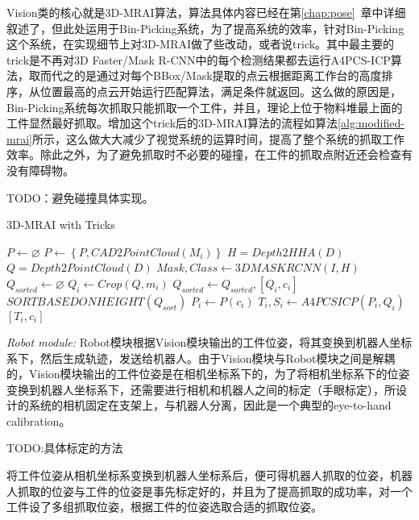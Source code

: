 Vision类的核心就是3D-MRAI算法，算法具体内容已经在第\ref{chap:pose}~章中详细叙述了，但此处运用于Bin-Picking系统，为了提高系统的效率，针对Bin-Picking这个系统，在实现细节上对3D-MRAI做了些改动，或者说trick。其中最主要的trick是不再对3D Faster/Mask R-CNN中的每个检测结果都去运行A4PCS-ICP算法，取而代之的是通过对每个BBox/Mask提取的点云根据距离工作台的高度排序，从位置最高的点云开始运行匹配算法，满足条件就返回。这么做的原因是，Bin-Picking系统每次抓取只能抓取一个工件，并且，理论上位于物料堆最上面的工件显然最好抓取。增加这个trick后的3D-MRAI算法的流程如算法\ref{alg:modified-mrai}所示，这么做大大减少了视觉系统的运算时间，提高了整个系统的抓取工作效率。除此之外，为了避免抓取时不必要的碰撞，在工件的抓取点附近还会检查有没有障碍物。

TODO：避免碰撞具体实现。

\begin{algorithm}
  \caption{3D-MRAI with Tricks}
  \label{alg:modified-mrai}
  $P\leftarrow \varnothing$\;
   {
    $P\leftarrow \left\{P, CAD2PointCloud(M_i)\right\}$\;
  }
  $H = Depth2HHA(D)$\;
  $Q = Depth2PointCloud(D)$\;
  $Mask, Class \leftarrow 3DMASKRCNN(I, H)$
  $Q_{sorted}\leftarrow \varnothing$\;
   {
    $Q_i \leftarrow Crop(Q, m_i)$\;
    $Q_{sorted}\leftarrow {Q_{sorted}, [Q_i, c_i]}$\;
  }
  $SORTBASEDONHEIGHT(Q_{sort})$\;
   {
    $P_i \leftarrow P(c_i)$\;
    $T_i,S_i\leftarrow A4PCSICP(P_i, Q_i)$\;
     {
      \Return $\left[T_i, c_i\right]$\;
    }
  }
\end{algorithm}

\emph{Robot module:}
Robot模块根据Vision模块输出的工件位姿，将其变换到机器人坐标系下，然后生成轨迹，发送给机器人。由于Vision模块与Robot模块之间是解耦的，Vision模块输出的工件位姿是在相机坐标系下的，为了将相机坐标系下的位姿变换到机器人坐标系下，还需要进行相机和机器人之间的标定（手眼标定），所设计的系统的相机固定在支架上，与机器人分离，因此是一个典型的eye-to-hand calibration。

TODO:具体标定的方法

将工件位姿从相机坐标系变换到机器人坐标系后，便可得机器人抓取的位姿，机器人抓取的位姿与工件的位姿是事先标定好的，并且为了提高抓取的成功率，对一个工件设了多组抓取位姿，根据工件的位姿选取合适的抓取位姿。


